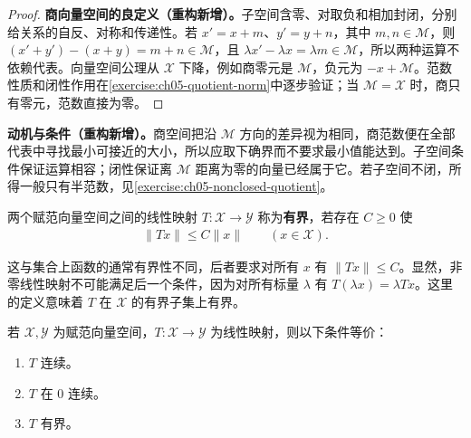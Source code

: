 \documentclass[../../main.tex]{subfiles}
\begin{document}
\begin{proof}
\textbf{商向量空间的良定义（重构新增）。}子空间含零、对取负和相加封闭，分别给关系的自反、对称和传递性。若 $x'=x+m$、$y'=y+n$，其中 $m,n\in\mathcal M$，则 $(x'+y')-(x+y)=m+n\in\mathcal M$，且 $\lambda x'-\lambda x=\lambda m\in\mathcal M$，所以两种运算不依赖代表。向量空间公理从 $\mathcal X$ 下降，例如商零元是 $\mathcal M$，负元为 $-x+\mathcal M$。范数性质和闭性作用在\cref{exercise:ch05-quotient-norm}中逐步验证；当 $\mathcal M=\mathcal X$ 时，商只有零元，范数直接为零。
\end{proof}
\begin{remark}
\textbf{动机与条件（重构新增）。}商空间把沿 $\mathcal M$ 方向的差异视为相同，商范数便在全部代表中寻找最小可接近的大小，所以应取下确界而不要求最小值能达到。子空间条件保证运算相容；闭性保证离 $\mathcal M$ 距离为零的向量已经属于它。若子空间不闭，所得一般只有半范数，见\cref{exercise:ch05-nonclosed-quotient}。
\end{remark}
\begin{definition}[有界线性映射]\label{definition:ch05-bounded-linear-map}
两个赋范向量空间之间的线性映射 $T:\mathcal X\to\mathcal Y$ 称为\textbf{有界}，若存在 $C\ge0$ 使
\begin{align*}
\|Tx\|\le C\|x\|\qquad(x\in\mathcal X).
\end{align*}
\end{definition}
这与集合上函数的通常有界性不同，后者要求对所有 $x$ 有 $\|Tx\|\le C$。显然，非零线性映射不可能满足后一个条件，因为对所有标量 $\lambda$ 有 $T(\lambda x)=\lambda Tx$。这里的定义意味着 $T$ 在 $\mathcal X$ 的有界子集上有界。
\begin{proposition}\label{proposition:ch05-linear-continuity}
若 $\mathcal X,\mathcal Y$ 为赋范向量空间，$T:\mathcal X\to\mathcal Y$ 为线性映射，则以下条件等价：
\begin{enumerate}
\item\label{item:ch05-linear-continuous} $T$ 连续。
\item\label{item:ch05-linear-continuous-zero} $T$ 在 $0$ 连续。
\item\label{item:ch05-linear-bounded} $T$ 有界。
\end{enumerate}
\end{proposition}
\end{document}
